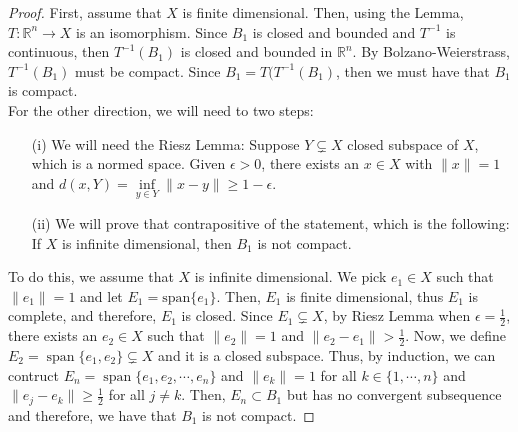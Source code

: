 \documentclass[oneside]{book}
\newcommand{\R}{{\mathbb R}}
\newcommand{\sbs}{\subset}
\DeclareMathOperator*{\spa}{span}
\begin{document}
\begin{proof}
First, assume that $X$ is finite dimensional. Then, using the Lemma, $T: \R^n \to X$ is an isomorphism. Since $B_1$ is closed and bounded and $T^{-1}$ is continuous, then $T^{-1}(B_1)$ is closed and bounded in $\R^n$. By Bolzano-Weierstrass, $T^{-1}(B_1)$ must be compact. Since $B_1 = T(T^{-1}(B_1)$, then we must have that $B_1$ is compact. \\
For the other direction, we will need to two steps:
\begin{enumerate}[topsep=-15pt, itemsep=0pt]
\item[(i)] We will need the Riesz Lemma: Suppose $Y \subsetneq X$ closed subspace of $X$, which is a normed space. Given $\epsilon >0$, there exists an $x \in X$ with $\| x \| = 1$ and $d(x, Y) = \inf\limits_{y \in Y} \| x - y \| \geq 1 - \epsilon$. 
\item[(ii)] We will prove that contrapositive of the statement, which is the following: If $X$ is infinite dimensional, then $B_1$ is not compact. 
\end{enumerate}
To do this, we assume that $X$ is infinite dimensional. We pick $e_1 \in X$ such that $\| e_1 \| = 1$ and let $E_1 = \text{span}\{ e_1 \}$. Then, $E_1$ is finite dimensional, thus $E_1$ is complete, and therefore, $E_1$ is closed. Since $E_1 \subsetneq X$, by Riesz Lemma when $\epsilon = \frac{1}{2}$, there exists an $e_2 \in X$ such that $\| e_2 \| = 1$ and $\| e_2 - e_1 \| > \frac{1}{2}$. Now, we define $E_2 = \spa\{ e_1, e_2\} \subsetneq X$ and it is a closed subspace. Thus, by induction, we can contruct $E_n = \spa\{ e_1, e_2, \cdots, e_n \}$ and $\| e_k \| = 1$ for all $k \in \{ 1, \cdots, n \}$ and $\| e_j - e_k \| \geq \frac{1}{2}$ for all $j \neq k$. Then, $E_n \sbs B_1$ but has no convergent subsequence and therefore, we have that $B_1$ is not compact. 
\end{proof}
\end{document}
